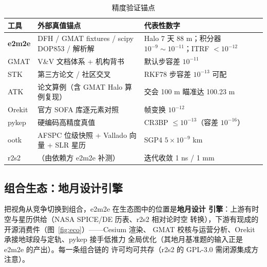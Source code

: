 \begin{table}[htbp]
\centering\small
\caption{精度验证锚点}
\label{tab:prec}
\begin{tabularx}{\textwidth}{@{}lXl@{}}
\toprule
\textbf{工具} & \textbf{外部真值锚点} & \textbf{代表性数字} \\
\midrule
\textbf{e2m2e} & DFH / GMAT fixtures / scipy DOP853 / 解析解 &
Halo 7 天 88 m；积分器 $10^{-9}\sim10^{-11}$；ITRF $<10^{-12}$ \\
GMAT & V\&V 文档体系 + 机构背书 & 默认步容差 $10^{-11}$ \\
STK & 第三方论文 / 社区交叉 & RKF78 步容差 $10^{-13}$ 可配 \\
ATK & 论文算例（含 GMAT Halo 算例复现） & 交会 100 m 瞄准达 100.23 m \\
Orekit & 官方 SOFA 库逐元素对照 & 帧变换 $10^{-12}$ \\
pykep & 硬编码高精度真值 & CR3BP $\le 10^{-13}$（容差 $10^{-16}$） \\
ootk & AFSPC 位级快照 + Vallado 向量 + SLR 星历 & SGP4 $5\times10^{-9}$ km \\
r2s2 & （由依赖方 e2m2e 补测） & 迭代收敛 1 ns / 1 mm \\
\bottomrule
\end{tabularx}
\end{table}

\subsection{组合生态：地月设计引擎}

把视角从竞争切换到组合，e2m2e 在生态图中的位置是\textbf{地月设计
引擎}：上游有时空与星历供给（NASA SPICE/DE 历表、r2s2 相对论时空
转换），下游有现成的开源消费件（图~\ref{fig:eco}）——Cesium 渲染、
GMAT 校核与运营分析、Orekit 承接地球段与定轨、pykep 接手低推力
全局优化（其地月基准题的输入正是 e2m2e 的产出）。每一条组合链的
许可均可共存（r2s2 的 GPL-3.0 需闭源集成方注意）。

